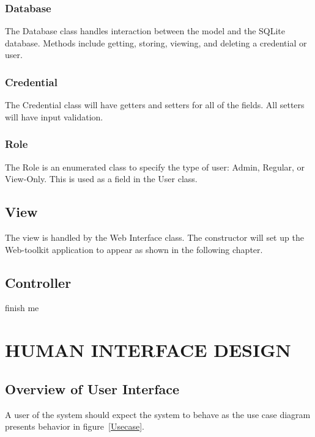 \documentclass[letterpaper,12pt,oneside,listof=totoc]{scrreprt}
\begin{document}
\subsection{Database}
The Database class handles interaction between the model and the SQLite database. Methods include getting, storing, viewing, and deleting a credential or user. 

\subsection{Credential}
The Credential class will have getters and setters for all of the fields. All setters will have input validation. 

\subsection{Role}
The Role is an enumerated class to specify the type of user: Admin, Regular, or View-Only. This is used as a field in the User class. 

\section{View}
The view is handled by the Web Interface class. The constructor will set up the Web-toolkit application to appear as shown in the following chapter. 

\section{Controller}
finish me

\chapter{HUMAN INTERFACE DESIGN}
\section{Overview of User Interface}
A user of the system should expect the system to behave as the use case diagram presents behavior in figure~\ref{Usecase}.
\end{document}
